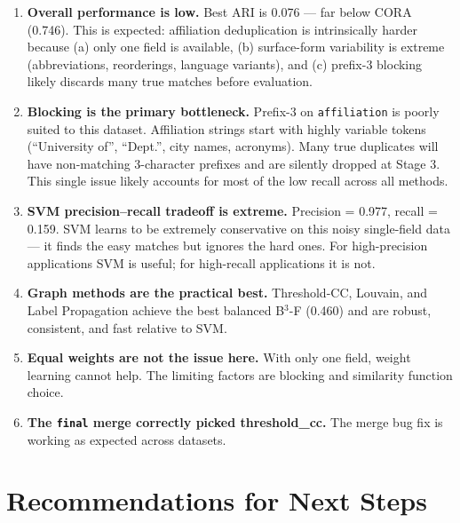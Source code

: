 \documentclass[11pt, a4paper]{article}
\begin{document}
\begin{enumerate}[leftmargin=*, label=\arabic*.]
  \item \textbf{Overall performance is low.} Best ARI is 0.076 --- far below CORA (0.746).
        This is expected: affiliation deduplication is intrinsically harder because (a) only one
        field is available, (b) surface-form variability is extreme (abbreviations, reorderings,
        language variants), and (c) prefix-3 blocking likely discards many true matches before
        evaluation.

  \item \textbf{Blocking is the primary bottleneck.} Prefix-3 on \texttt{affiliation} is poorly
        suited to this dataset. Affiliation strings start with highly variable tokens
        (``University of'', ``Dept.'', city names, acronyms). Many true duplicates will have
        non-matching 3-character prefixes and are silently dropped at Stage 3. This single issue
        likely accounts for most of the low recall across all methods.

  \item \textbf{SVM precision--recall tradeoff is extreme.} Precision = 0.977, recall = 0.159.
        SVM learns to be extremely conservative on this noisy single-field data --- it finds the
        easy matches but ignores the hard ones. For high-precision applications SVM is useful;
        for high-recall applications it is not.

  \item \textbf{Graph methods are the practical best.} Threshold-CC, Louvain, and Label
        Propagation achieve the best balanced B$^3$-F (0.460) and are robust, consistent, and
        fast relative to SVM.

  \item \textbf{Equal weights are not the issue here.} With only one field, weight learning
        cannot help. The limiting factors are blocking and similarity function choice.

  \item \textbf{The \texttt{final} merge correctly picked threshold\_cc.} The merge bug fix
        is working as expected across datasets.
\end{enumerate}

\section{Recommendations for Next Steps}
\end{document}
